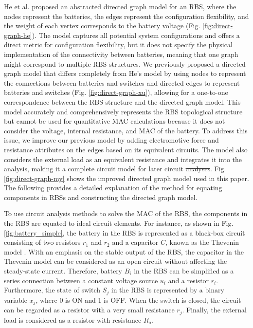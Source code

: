 \documentclass{article}
\providecommand{\DIFadd}[1]{{\protect\color{blue}\uwave{#1}}} %
\providecommand{\DIFdel}[1]{{\protect\color{red}\sout{#1}}}                      %
\providecommand{\DIFaddbegin}{} %
\providecommand{\DIFaddend}{} %
\providecommand{\DIFdelbegin}{} %
\providecommand{\DIFdelend}{} %
\newcommand{\DIFscaledelfig}{0.5}
\newlength{\DIFdelgraphicswidth} %
\newlength{\DIFdelgraphicsheight} %
\newcommand{\DIFaddincludegraphics}[2][]{{\color{blue}\fbox{\DIFOincludegraphics[#1]{#2}}}} %
\newcommand{\DIFdelincludegraphics}[2][]{%
\sbox{\DIFdelgraphicsbox}{\DIFOincludegraphics[#1]{#2}}%
\settoboxwidth{\DIFdelgraphicswidth}{\DIFdelgraphicsbox} %
\settoboxtotalheight{\DIFdelgraphicsheight}{\DIFdelgraphicsbox} %
\scalebox{\DIFscaledelfig}{%
\parbox[b]{\DIFdelgraphicswidth}{\usebox{\DIFdelgraphicsbox}\\[-\baselineskip] \rule{\DIFdelgraphicswidth}{0em}}\llap{\resizebox{\DIFdelgraphicswidth}{\DIFdelgraphicsheight}{%
\setlength{\unitlength}{\DIFdelgraphicswidth}%
\begin{picture}(1,1)%
\thicklines\linethickness{2pt} %
{\color[rgb]{1,0,0}\put(0,0){\framebox(1,1){}}}%
{\color[rgb]{1,0,0}\put(0,0){\line( 1,1){1}}}%
{\color[rgb]{1,0,0}\put(0,1){\line(1,-1){1}}}%
\end{picture}%
}\hspace*{3pt}}} %
} %
\DeclareRobustCommand{\DIFaddbegin}{\DIFOaddbegin \let\includegraphics\DIFaddincludegraphics} %
\DeclareRobustCommand{\DIFaddend}{\DIFOaddend \let\includegraphics\DIFOincludegraphics} %
\DeclareRobustCommand{\DIFdelbegin}{\DIFOdelbegin \let\includegraphics\DIFdelincludegraphics} %
\DeclareRobustCommand{\DIFdelend}{\DIFOaddend \let\includegraphics\DIFOincludegraphics} %
\begin{document}
He et al. \cite{heExploringAdaptiveReconfiguration2013} proposed an abstracted directed graph model for an RBS, where the nodes represent the batteries, the edges represent the configuration flexibility, and the weight of each vertex corresponds to the battery voltage (Fig. \ref{fig:direct-graph-he}). 
The model captures all potential system configurations and offers a direct metric for configuration flexibility, but it does not specify the physical implementation of the connectivity between batteries, meaning that one graph might correspond to multiple RBS structures.
We previously proposed a directed graph model that differs completely from He's model by using nodes to represent the connections between batteries and switches and directed edges to represent batteries and switches (Fig. \ref{fig:direct-graph-xu}), allowing for a one-to-one correspondence between the RBS structure and the directed graph model. 
This model accurately and comprehensively represents the RBS topological structure but cannot be used for quantitative MAC calculations because it does not consider  the voltage, internal resistance, and MAC of the battery. 
To address this issue, we improve our previous model by adding electromotive force and resistance attributes on the edges based on its equivalent circuits.
The model also considers the external load as an equivalent resistance and integrates it into the analysis, making it a complete circuit model for later circuit \DIFdelbegin \DIFdel{analyses}\DIFdelend \DIFaddbegin \DIFadd{analyzes}\DIFaddend .
Fig. \ref{fig:direct-graph-my} shows the improved directed graph model used in this paper.
The following  provides a detailed explanation of the method for equating components in RBSs and constructing the directed graph model.


To use circuit analysis methods to solve the MAC of the RBS, the components in the RBS are equated to ideal circuit elements.
For instance, as shown in Fig. \ref{fig:battery_simple}, the battery in the RBS is represented as a black-box circuit consisting of two resistors $r_1$ and $r_2$ and a capacitor $C$, known as the Thevenin model \cite{hongwenheStateofChargeEstimationLithiumIon2011,mousavig.VariousBatteryModels2014}.
With an emphasis on the stable output of the RBS, the capacitor in the Thevenin model can be considered as an open circuit without affecting the steady-state current.
Therefore,  battery $B_i$ in the RBS can be simplified as a series connection between a constant voltage source $u_{i}$ and a resistor $r_{i}$.
Furthermore, the state of switch $S_j$ in the RBS is represented by a binary variable $x_j$, where 0 is ON and 1 is OFF.
When the switch is closed, the circuit can be regarded as a resistor with a very small resistance $r_{j}$.
Finally, the external load is considered as a resistor with resistance $R_o$.
\end{document}
